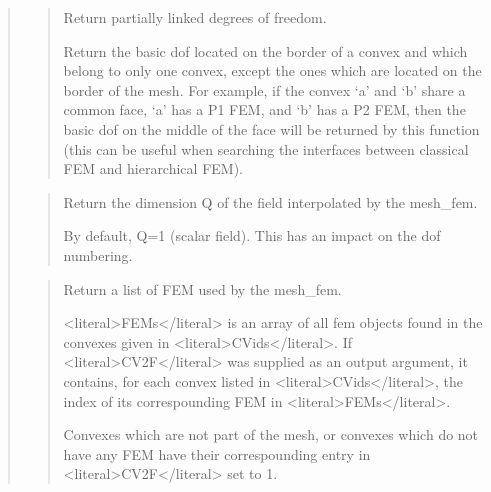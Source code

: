 \documentclass[a4paper,11pt,english]{sphinxmanual}
\begin{document}
\begin{quote}
\sphinxAtStartPar
{}
\begin{quote}

\sphinxAtStartPar
Return partially linked degrees of freedom.

\sphinxAtStartPar
Return the basic dof located on the border of a convex and which belong
to only one convex, except the ones which are located on the border
of the mesh.  For example, if the convex ‘a’ and ‘b’ share a common
face, ‘a’ has a P1 FEM, and ‘b’ has a P2 FEM, then the basic dof on the
middle of the face will be returned by this function (this can be
useful when searching the interfaces between classical FEM and
hierarchical FEM).
\end{quote}

\sphinxAtStartPar
{}
\begin{quote}

\sphinxAtStartPar
Return the dimension Q of the field interpolated by the mesh\_fem.

\sphinxAtStartPar
By default, Q=1 (scalar field). This has an impact on the dof numbering.
\end{quote}

\sphinxAtStartPar
{}
\begin{quote}

\sphinxAtStartPar
Return a list of FEM used by the mesh\_fem.

\sphinxAtStartPar
\textless{}literal\textgreater{}FEMs\textless{}/literal\textgreater{} is an array of all fem objects found in the convexes
given in \textless{}literal\textgreater{}CVids\textless{}/literal\textgreater{}. If \textless{}literal\textgreater{}CV2F\textless{}/literal\textgreater{} was supplied as an output argument,
it contains, for each convex listed in \textless{}literal\textgreater{}CVids\textless{}/literal\textgreater{}, the index of its
correspounding FEM in \textless{}literal\textgreater{}FEMs\textless{}/literal\textgreater{}.

\sphinxAtStartPar
Convexes which are not part of the mesh, or convexes which do not
have any FEM have their correspounding entry in \textless{}literal\textgreater{}CV2F\textless{}/literal\textgreater{} set to \sphinxhyphen{}1.
\end{quote}


\end{quote}
\end{document}
